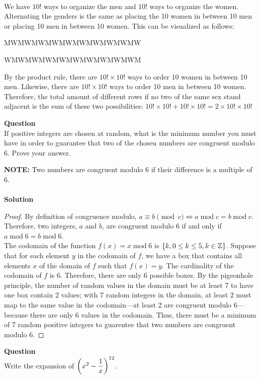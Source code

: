 \documentclass[article, 11pt]{article}
\newcounter{question}
\def\questionnum{{\Large\bfseries{Question \arabic{question} }}\\[1em]}
\newcommand{\question}{
    \stepcounter{question}
    \questionnum
}
\newcommand{\solution}{
    {{\large\bfseries{Solution}}}
}
\DeclarePairedDelimiter\paren{(}{)} %
\newcommand{\df}{\displaystyle\frac} %
\newcommand{\Mod}[1]{\;\mathrm{mod}\; #1} %
\DeclarePairedDelimiter\set{\{}{\}}
\newcommand{\ints}{\mathbb{Z}}
\begin{document}
\\
We have $10!$ ways to organize the men and $10!$ ways to organize the women. Alternating the genders is the same as placing the 10 women in between 10 men or placing 10 men in between 10 women. This can be visualized as follows:
\begin{center}
    MWMWMWMWMWMWMWMWMWMW
\end{center}
\begin{center}
    WMWMWMWMWMWMWMWMWMWM
\end{center}
By the product rule, there are $10! \times 10!$ ways to order 10 women in between 10 men. Likewise, there are $10! \times 10!$ ways to order 10 men in between 10 women. Therefore, the total amount of different rows if no two of the same sex stand adjacent is the sum of these two possibilities: $10! \times 10! + 10! \times 10! = 2 \times 10! \times 10!$
\newpage
\question
If positive integers are chosen at random, what is the minimum number you must have in order to guarantee that two of the chosen numbers are congruent modulo 6.   Prove your answer. \par  {\bf NOTE:} Two numbers are congruent modulo 6 if their difference is a multiple of 6.\\
\\
\solution
\begin{proof}
    By definition of congruence modulo, $ a \equiv b \pmod{c} \iff a \Mod{c} = b \Mod{c}$. Therefore, two integers, $a$ and $b$, are congruent modulo 6 if and only if $a \Mod{6} = b \Mod{6}$. \\
    
    The codomain of the function $f(x) = x \Mod 6$ is $\set*{k, 0 \leq k \leq 5, k \in \ints}$. Suppose that for each element $y$ in the codomain of $f$, we have a box that contains all elements $x$ of the domain of $f$ such that $f(x)=y$. The cardinality of the codomain of $f$ is 6. Therefore, there are only 6 possible boxes. By the pigeonhole principle, the number of random values in the domain must be at least 7 to have one box contain 2 values; with 7 random integers in the domain, at least 2 must map to the same value in the codomain---at least 2 are congruent modulo 6---because there are only 6 values in the codomain. Thus, there must be a minimum of 7 random positive integers to guarentee that two numbers are congruent modulo 6.
\end{proof}
\newpage
\question
Write the expansion of $\paren*{x^2 -\df1 x}^{12}$. \\
\\
\end{document}
